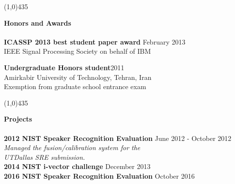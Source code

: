 \documentclass[doublespacing]{utdthesis}
\begin{document}
\begin{vita}
%
\vspace{0mm}
\line(1,0){435}


\vspace{0mm}
\textbf{\sc Honors and Awards\\\\} 
{\bf ICASSP 2013 best student paper award} \hfill {February 2013}\\
IEEE Signal Processing Society on behalf of IBM

\vspace{2mm}
{\bf Undergraduate Honors student}\hfill {2011}\\
Amirkabir University of Technology, Tehran, Iran \\
Exemption from graduate school entrance exam

\vspace{0mm}

\vspace{0mm}
\line(1,0){435}
\vspace{0mm}

\textbf{\sc Projects\\\\}
{\bf 2012 NIST Speaker Recognition Evaluation} \hfill {June 2012 - October 2012}\\
{\it Managed the fusion/calibration system for the \\UTDallas SRE submission.}\\

\vspace{-1mm}
{\bf 2014 NIST i-vector challenge} \hfill { December 2013}\\

{\bf 2016 NIST Speaker Recognition Evaluation} \hfill { October 2016}\\


\end{vita}
\end{document}
